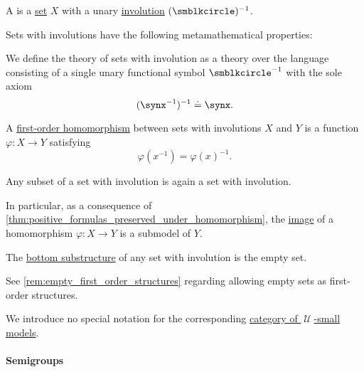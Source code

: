 \begin{definition}\label{def:set_with_involution}\mimprovised
  A  is a \hyperref[def:set]{set} \( X \) with a unary \hyperref[def:morphism_invertibility/involution]{involution} \( (\anon)^{-1} \).

  Sets with involutions have the following metamathematical properties:
  \begin{thmenum}
     We define the theory of sets with involution as a theory over the language consisting of a single unary functional symbol \( \anon^{-1} \) with the sole axiom
    \begin{equation}\label{eq:def:set_with_involution/theory/axiom}
      (\synx^{-1})^{-1} \syneq \synx.
    \end{equation}

     A \hyperref[def:first_order_homomorphism]{first-order homomorphism} between sets with involutions \( X \) and \( Y \) is a function \( \varphi: X \to Y \) satisfying
    \begin{equation}\label{eq:def:set_with_involution/homomorphism}
      \varphi(x^{-1})
      =
      \varphi(x)^{-1}.
    \end{equation}

     Any subset of a set with involution is again a set with involution.

    In particular, as a consequence of \cref{thm:positive_formulas_preserved_under_homomorphism}, the \hyperref[def:set_valued_map/image]{image} of a homomorphism \( \varphi: X \to Y \) is a submodel of \( Y \).

    The \hyperref[thm:substructures_form_complete_lattice/bottom]{bottom substructure} of any set with involution is the empty set.

    See \cref{rem:empty_first_order_structures} regarding allowing empty sets as first-order structures.

     We introduce no special notation for the corresponding \hyperref[def:category_of_small_first_order_models]{category of \( \mscrU \)-small models}.
  \end{thmenum}
\end{definition}

\paragraph{Semigroups}

